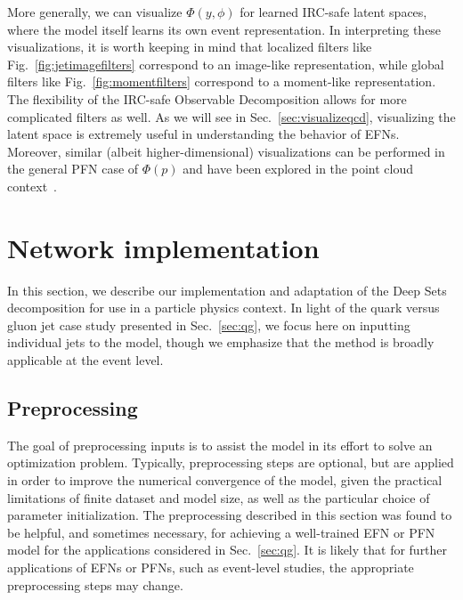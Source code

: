 \documentclass[letterpaper,11pt]{article}
\DeclareRobustCommand{\Sec}[1]{Sec.~\ref{#1}}
\DeclareRobustCommand{\Fig}[1]{Fig.~\ref{#1}}
\begin{document}
More generally, we can visualize $\Phi(y,\phi)$ for learned IRC-safe latent spaces, where the model itself learns its own event representation.
%
In interpreting these visualizations, it is worth keeping in mind that localized filters like \Fig{fig:jetimagefilters} correspond to an image-like representation, while global filters like \Fig{fig:momentfilters} correspond to a moment-like representation.
%
The flexibility of the IRC-safe Observable Decomposition allows for more complicated filters as well.
%
As we will see in \Sec{sec:visualizeqcd}, visualizing the latent space is extremely useful in understanding the behavior of EFNs.
%
Moreover, similar (albeit higher-dimensional) visualizations can be performed in the general PFN case of $\Phi(p)$ and have been explored in the point cloud context~\cite{DBLP:conf/cvpr/QiSMG17}.

\section{Network implementation}
\label{sec:implement}


In this section, we describe our implementation and adaptation of the Deep Sets decomposition for use in a particle physics context.
%
In light of the quark versus gluon jet case study presented in \Sec{sec:qg}, we focus here on inputting individual jets to the model, though we emphasize that the method is broadly applicable at the event level.



\subsection{Preprocessing}
\label{sec:preproc}


The goal of preprocessing inputs is to assist the model in its effort to solve an optimization problem.
%
Typically, preprocessing steps are optional, but are applied in order to improve the numerical convergence of the model, given the practical limitations of finite dataset and model size, as well as the particular choice of parameter initialization.
%
The preprocessing described in this section was found to be helpful, and sometimes necessary, for achieving a well-trained EFN or PFN model for the applications considered in \Sec{sec:qg}.
%
It is likely that for further applications of EFNs or PFNs, such as event-level studies, the appropriate preprocessing steps may change.
\end{document}
